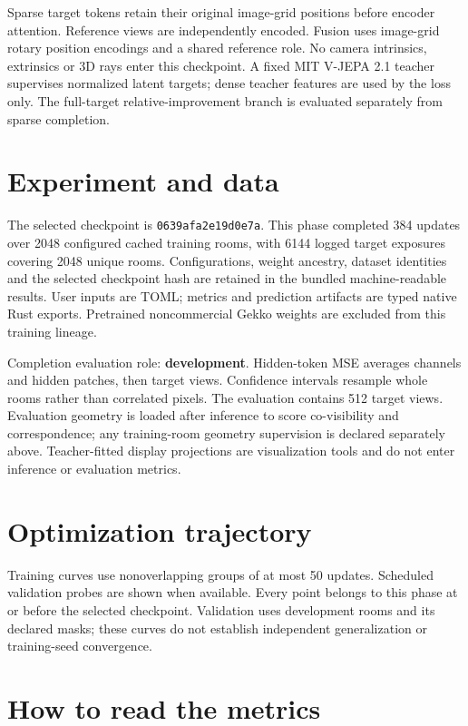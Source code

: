 \documentclass[10pt]{article}
\begin{document}
Sparse target tokens retain their original image-grid positions before encoder attention. Reference views are independently encoded. Fusion uses image-grid rotary position encodings and a shared reference role. No camera intrinsics, extrinsics or 3D rays enter this checkpoint. A fixed MIT V-JEPA 2.1 teacher supervises normalized latent targets; dense teacher features are used by the loss only. The full-target relative-improvement branch is evaluated separately from sparse completion.

\section{Experiment and data}
The selected checkpoint is \texttt{0639afa2e19d0e7a}. This phase completed 384 updates over 2048 configured cached training rooms, with 6144 logged target exposures covering 2048 unique rooms. Configurations, weight ancestry, dataset identities and the selected checkpoint hash are retained in the bundled machine-readable results. User inputs are TOML; metrics and prediction artifacts are typed native Rust exports. Pretrained noncommercial Gekko weights are excluded from this training lineage.

Completion evaluation role: \textbf{development}. Hidden-token MSE averages channels and hidden patches, then target views. Confidence intervals resample whole rooms rather than correlated pixels. The evaluation contains 512 target views. Evaluation geometry is loaded after inference to score co-visibility and correspondence; any training-room geometry supervision is declared separately above. Teacher-fitted display projections are visualization tools and do not enter inference or evaluation metrics.

\section{Optimization trajectory}
\begin{center}\resizebox{0.98\linewidth}{!}{}\end{center}
Training curves use nonoverlapping groups of at most 50 updates. Scheduled validation probes are shown when available. Every point belongs to this phase at or before the selected checkpoint. Validation uses development rooms and its declared masks; these curves do not establish independent generalization or training-seed convergence.
\section{How to read the metrics}
\end{document}
